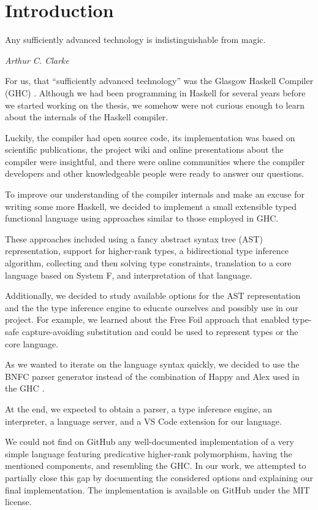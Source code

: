 \chapter{Introduction}
\label{chap:Introduction}

\epigraph{Any sufficiently advanced technology is indistinguishable from magic.}{\textit{Arthur C. Clarke}}

For us, that ``sufficiently advanced technology'' was the Glasgow Haskell Compiler (GHC) \cite{ghc-site}.
Although we had been programming in Haskell for several years before we started working on the thesis, we somehow were not curious enough to learn about the internals of the Haskell compiler.

Luckily, the compiler had open source code, its implementation was based on scientific publications, the project wiki and online presentations about the compiler were insightful, and there were online communities where the compiler developers and other knowledgeable people were ready to answer our questions.

To improve our understanding of the compiler internals and make an excuse for  writing some more Haskell, we decided to implement a small extensible typed functional language using approaches similar to those employed in GHC.

These approaches included using a fancy abstract syntax tree (AST) representation, support for higher-rank types, a bidirectional type inference algorithm, collecting and then solving type constraints, translation to a core language based on System F, and interpretation of that language.

Additionally, we decided to study available options for the AST representation and the the type inference engine to educate ourselves and possibly use in our project. For example, we learned about the Free Foil approach \cite{kudasov-free-2024} that enabled type-safe capture-avoiding substitution and could be used to represent types or the core language.

As we wanted to iterate on the language syntax quickly, we decided to use the BNFC parser generator \cite{bnfc-parser-generator} instead of the combination of Happy and Alex used in the GHC \cite{ghc-2025}.

At the end, we expected to obtain a parser, a type inference engine, an interpreter, a language server, and a VS Code extension for our language.

We could not find on GitHub any well-documented implementation of a very simple language featuring predicative higher-rank polymorphism, having the mentioned components, and resembling the GHC. In our work, we attempted to partially close this gap by documenting the considered options and explaining our final implementation. The implementation \cite{deemp-higher-rank-free-foil} is available on GitHub under the MIT license.

